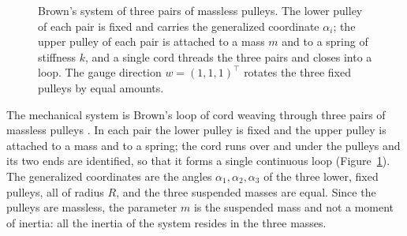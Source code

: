 \documentclass[12pt]{article}
\theoremstyle{plain}
\theoremstyle{definition}
\theoremstyle{remark}
\begin{document}
\begin{figure}[htbp]
		\caption{Brown's system of three pairs of massless pulleys. The lower pulley
			of each pair is fixed and carries the generalized coordinate $\alpha_{i}$;
			the upper pulley of each pair is attached to a mass $m$ and to a spring of
			stiffness $k$, and a single cord threads the three pairs and closes into a
			loop. The gauge direction $w=(1,1,1)^{\top}$ rotates the three fixed pulleys
			by equal amounts.}
		\label{fig:pulley3}
	\end{figure}
	
	The mechanical system is Brown's loop of cord weaving through three pairs of
	massless pulleys \cite{Brown2023}. In each pair the lower pulley is fixed and
	the upper pulley is attached to a mass and to a spring; the cord runs over and
	under the pulleys and its two ends are identified, so that it forms a single
	continuous loop (Figure~\ref{fig:pulley3}). The generalized coordinates are the
	angles $\alpha_{1},\alpha_{2},\alpha_{3}$ of the three lower, fixed pulleys, all
	of radius $R$, and the three suspended masses are equal. Since the pulleys are
	massless, the parameter $m$ is the suspended mass and not a moment of inertia:
	all the inertia of the system resides in the three masses.
	
\end{document}
